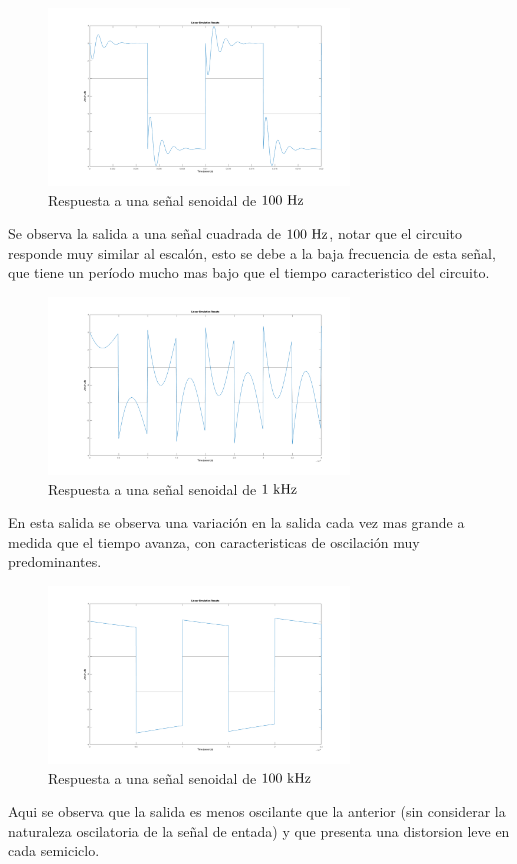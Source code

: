 \begin{figure}[hbt]
	\centering
	\includegraphics[width=8cm]{imagenes/rtasqar100}	\caption{Respuesta a una señal senoidal de $100\ \si{\hertz}$}	
\end{figure}

Se observa la salida a una señal cuadrada de $100 \ \si{\hertz}$, notar que el circuito responde muy similar al escal\'on, esto se debe a la baja frecuencia de esta señal, que tiene un per\'iodo mucho mas bajo que el tiempo caracteristico del circuito.

\begin{figure}[hbt]
	\centering
	\includegraphics[width=8cm]{imagenes/rtasqar1k}	\caption{Respuesta a una señal senoidal de $1\ \si{\kilo\hertz}$}	
\end{figure}
En esta salida se observa una variaci\'on en la salida cada vez mas grande a medida que el tiempo avanza, con caracteristicas de oscilaci\'on muy predominantes.\\

\pagebreak
\begin{figure}[hbt]
	\centering
	\includegraphics[width=8cm]{imagenes/rtasqar100k}	\caption{Respuesta a una señal senoidal de $100\ \si{\kilo\hertz}$}	
\end{figure}
Aqui se observa que la salida es menos oscilante que la anterior (sin considerar la  naturaleza oscilatoria de la señal de entada)
y que presenta una distorsion leve en cada semiciclo.

